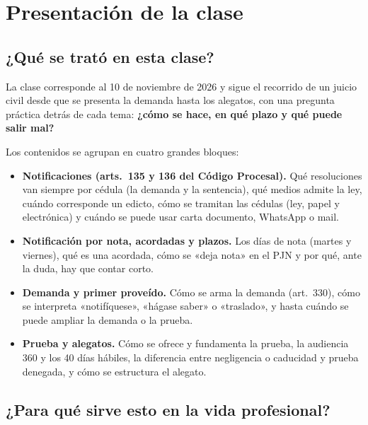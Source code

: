 \documentclass[12pt,oneside]{book}
\begin{document}

\chapter[Presentación de la clase]{Presentación de la clase}

\section{¿Qué se trató en esta clase?}

La clase corresponde al 10 de noviembre de 2026 y sigue el recorrido de un juicio civil desde que se presenta la demanda hasta los alegatos, con una pregunta práctica detrás de cada tema: \textbf{¿cómo se hace, en qué plazo y qué puede salir mal?}

Los contenidos se agrupan en cuatro grandes bloques:

\begin{itemize}
    \item \textbf{Notificaciones (arts.\ 135 y 136 del Código Procesal).} Qué resoluciones van siempre por cédula (la demanda y la sentencia), qué medios admite la ley, cuándo corresponde un edicto, cómo se tramitan las cédulas (ley, papel y electrónica) y cuándo se puede usar carta documento, WhatsApp o mail.
    \item \textbf{Notificación por nota, acordadas y plazos.} Los días de nota (martes y viernes), qué es una acordada, cómo se «deja nota» en el PJN y por qué, ante la duda, hay que contar corto.
    \item \textbf{Demanda y primer proveído.} Cómo se arma la demanda (art.\ 330), cómo se interpreta «notifíquese», «hágase saber» o «traslado», y hasta cuándo se puede ampliar la demanda o la prueba.
    \item \textbf{Prueba y alegatos.} Cómo se ofrece y fundamenta la prueba, la audiencia 360 y los 40 días hábiles, la diferencia entre negligencia o caducidad y prueba denegada, y cómo se estructura el alegato.
\end{itemize}

\section{¿Para qué sirve esto en la vida profesional?}
\end{document}
